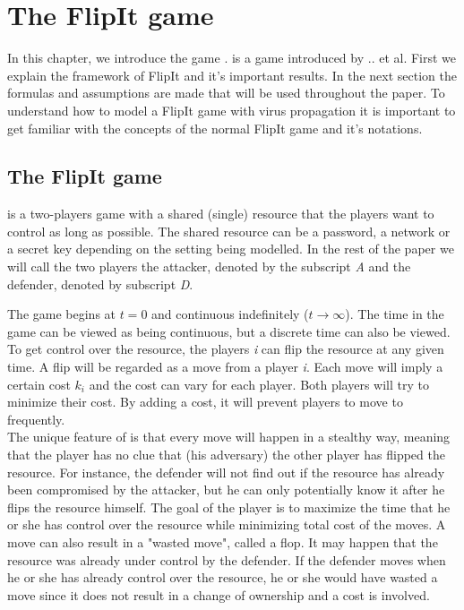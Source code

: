 \chapter{The FlipIt game}
\label{cha:2}


In this chapter, we introduce the game  \cite{FlipIt}.  is a game introduced by .. et al. First we explain the framework of FlipIt and it's important results. In the next section the formulas and assumptions are made that will be used throughout the paper. To understand how to model a FlipIt game with virus propagation it is important to get familiar with the concepts of the normal FlipIt game and it's notations.   

\section{The FlipIt game}
 is a two-players game with a shared (single) resource that the players want to control as long as possible. The shared resource can be a password, a network or a secret key depending on the setting being modelled. In the rest of the paper we will call the two players the attacker, denoted by the subscript \textit{A} and the defender, denoted by subscript \textit{D}. 

The game begins at $t=0$ and continuous indefinitely ($t \rightarrow \infty $). The time in the game can be viewed as being continuous, but a discrete time can also be viewed. To get control over the resource, the players \textit{i} can flip the resource at any given time. A flip will be regarded as a move from a player \textit{i}. Each move will imply a certain cost $k_{i}$ and the cost can vary for each player. Both players will try to minimize their cost. By adding a cost, it will prevent players to move to frequently. \\

The unique feature of  is that every move will happen in a stealthy way, meaning that the player has no clue that (his adversary) the other player has flipped the resource. For instance, the defender will not find out if the resource has already been compromised by the attacker, but he can only potentially know it after he flips the resource himself. The goal of the player is to maximize the time that he or she has control over the resource while minimizing total cost of the moves. A move can also result in a "wasted move", called a flop. It may happen that the resource was already under control by the defender. If the defender moves when he or she has already control over the resource, he or she would have wasted a move since it does not result in a change of ownership and a cost is involved. \\


